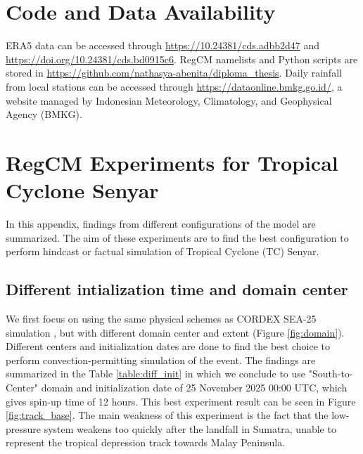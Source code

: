 \appendix

\chapter{Code and Data Availability} 
\label{appendix:code_and_data}

ERA5 data can be accessed through \url{https://10.24381/cds.adbb2d47} and \url{https://doi.org/10.24381/cds.bd0915c6}. RegCM namelists and Python scripts are stored in \url{https://github.com/nathasya-abenita/diploma_thesis}. Daily rainfall from local stations can be accessed through \url{https://dataonline.bmkg.go.id/}, a website managed by Indonesian Meteorology, Climatology, and Geophysical Agency (BMKG). 

\chapter{RegCM Experiments for Tropical Cyclone Senyar}
\label{appendix:exp}

In this appendix, findings from different configurations of the model are summarized. The aim of these experiments are to find the best configuration to perform hindcast or factual simulation of Tropical Cyclone (TC) Senyar.

\section*{Different intialization time and domain center}

We first focus on using the same physical schemes as CORDEX SEA-25 simulation \citep{coppola20255th}, but with different domain center and extent (Figure \ref{fig:domain}). Different centers and initialization dates are done to find the best choice to perform convection-permitting simulation of the event. The findings are summarized in the Table \ref{table:diff_init} in which we conclude to use "South-to-Center" domain and initialization date of 25 November 2025 00:00 UTC, which gives spin-up time of 12 hours. This best experiment result can be seen in Figure \ref{fig:track_base}. The main weakness of this experiment is the fact that the low-pressure system weakens too quickly after the landfall in Sumatra, unable to represent the tropical depression track towards Malay Peninsula.

